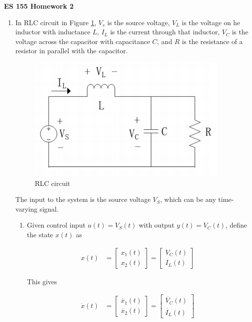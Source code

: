 \documentclass[11pt]{article}
\theoremstyle{definition}
\begin{document}
\textbf{\huge{ES 155 Homework 2}}    %
\normalsize

\begin{enumerate}
    \item %

    In RLC circuit in Figure \ref{fig:RLCcircuit}, $V_s$ is the source voltage, $V_L$ is the voltage on he inductor with inductance $L$, $I_L$ is the current through that inductor, $V_C$ is the voltage across the capacitor with capacitance $C$, and $R$ is the resistance of a resistor in parallel with the capacitor.

    \begin{figure}[h]
    	\centering
    	\includegraphics[width = 0.4 \textwidth]{ES155P2_1_RLCcircuit.png}
    	\caption{RLC circuit}
    	\label{fig:RLCcircuit}
    \end{figure}

    The input to the system is the source voltage $V_S$, which can be any time-varying signal.

    \begin{enumerate}
    	\item %
    	Given control input $u(t) = V_S(t)$ with output $y(t) = V_C(t)$, define the state $x(t)$ as

    	\begin{align}
    		x(t) &= \begin{bmatrix} x_1(t) \\ x_2(t) \end{bmatrix} = \begin{bmatrix} V_C(t) \\ I_L(t) \end{bmatrix}
    	\end{align}

    	This gives 

    	\begin{align}
    		\dot{x}(t) &= \begin{bmatrix} \dot{x_1}(t) \\ \dot{x_2}(t) \end{bmatrix} = \begin{bmatrix} \dot{V_C}(t) \\ \dot{I_L}(t) \end{bmatrix}
    	\end{align}


\end{enumerate}
\end{enumerate}
\end{document}
